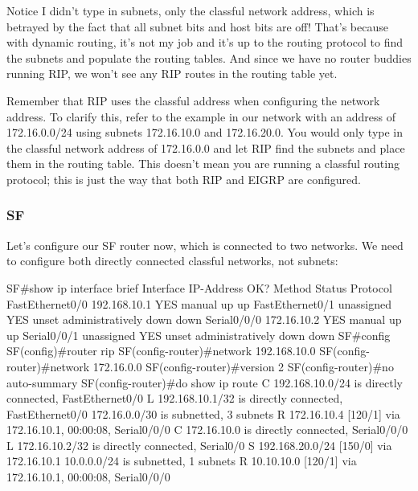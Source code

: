 Notice I didn't type in subnets, only the classful network address,
which is betrayed by the fact that all subnet bits and host bits are
off! That's because with dynamic routing, it's not my job and it's up to
the routing protocol to find the subnets and populate the routing
tables. And since we have no router buddies running RIP, we won't see
any RIP routes in the routing table yet.

\begin{note}
Remember that RIP uses the classful address when configuring the network address. To clarify this, refer to
the example in our network with an address of 172.16.0.0/24 using
subnets 172.16.10.0 and 172.16.20.0. You would only type in the classful
network address of 172.16.0.0 and let RIP find the subnets and place
them in the routing table. This doesn't mean you are running a classful
routing protocol; this is just the way that both RIP and EIGRP are
configured.
\end{note}

\subsubsection{SF}

Let's configure our SF router now, which is connected to two networks.
We need to configure both directly connected classful networks, not
subnets:

\begin{cli}
SF#show ip interface brief
Interface         IP-Address      OK? Method Status             Protocol
FastEthernet0/0   192.168.10.1    YES manual up                    up
FastEthernet0/1   unassigned      YES unset  administratively down down
Serial0/0/0       172.16.10.2     YES manual up                    up
Serial0/0/1       unassigned      YES unset  administratively down down
SF#config
SF(config)#router rip
SF(config-router)#network 192.168.10.0
SF(config-router)#network 172.16.0.0
SF(config-router)#version 2
SF(config-router)#no auto-summary
SF(config-router)#do show ip route
C    192.168.10.0/24 is directly connected, FastEthernet0/0
L    192.168.10.1/32 is directly connected, FastEthernet0/0
     172.16.0.0/30 is subnetted, 3 subnets
R       172.16.10.4 [120/1] via 172.16.10.1, 00:00:08, Serial0/0/0
C       172.16.10.0 is directly connected, Serial0/0/0
L       172.16.10.2/32 is directly connected, Serial0/0
S    192.168.20.0/24 [150/0] via 172.16.10.1
     10.0.0.0/24 is subnetted, 1 subnets
R       10.10.10.0 [120/1] via 172.16.10.1, 00:00:08, Serial0/0/0
\end{cli}

